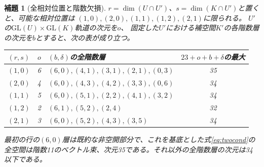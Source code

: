 \documentclass[11pt,a4paper]{ltjsarticle}
\newtheorem{lemma}[theorem]{補題}
\newcommand{\GL}{\mathrm{GL}}
\begin{document}
\begin{lemma}[全相対位置と階数欠損]\label{lem:allstrata}
$r=\dim(U\cap U')$、$s=\dim(K\cap U')$と置くと、可能な相対位置は
$(1,0),(2,0),(1,1),(1,2),(2,1)$に限られる。
$U'$の$\GL(U)\times\GL(K)$軌道の次元を$o$、
固定した$U'$における補空間$K'$の各階数層の次元を$b$とすると、次の表が成り立つ。
\begin{center}\small
\begin{tabular}{c c p{7.8cm} c}\toprule
$(r,s)$&$o$&$(b,\delta)$の全階数層&$23+o+b+\delta$の最大\\\midrule
$(1,0)$&6&$(6,0),(4,1),(3,1),(2,1),(0,3)$&35\\
$(2,0)$&4&$(6,0),(4,3),(4,2),(3,3),(0,6)$&34\\
$(1,1)$&5&$(6,0),(5,1),(2,2),(4,1),(3,2)$&34\\
$(1,2)$&2&$(6,1),(5,2),(2,4)$&32\\
$(2,1)$&3&$(6,0),(5,2),(4,3),(3,5)$&34\\\bottomrule
\end{tabular}
\end{center}
最初の行の$(6,0)$層は既約な非空開部分で、これを基底とした式\eqref{eq:twocond}の
全空間は階数11のベクトル束、次元35である。それ以外の全階数層の次元は34以下である。
\end{lemma}
\end{document}
